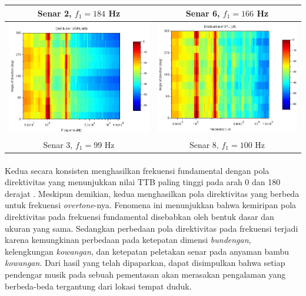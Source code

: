 \begin{table}[t!]
\begin{tabular}{c c}
        Senar 2, $f_1=184$ Hz & Senar 6, $f_1=166$ Hz \\
        \hline
        \includegraphics[width=65mm]{Gambar/senar3yangA.jpg} & \includegraphics[width=65mm]{Gambar/senar8yangB.jpg}\\
        Senar 3, $f_1=99$ Hz & Senar 8, $f_1=100$ Hz \\
        \hline
    \end{tabular}
    \label{tab:prosidingDirektivitas}
\end{table}
\newpage
\paragraph{}
\newpage
Kedua \bundengan secara konsisten menghasilkan frekuensi fundamental dengan pola direktivitas yang menunjukkan nilai TTB paling tinggi pada arah 0 dan 180 derajat \cite{prosidingDirektivitas}. Meskipun demikian, kedua \bundengan menghasilkan pola direktivitas yang berbeda untuk frekuensi \textit{overtone}-nya. Fenomena ini menunjukkan bahwa kemiripan pola direktivitas pada frekuensi fundamental disebabkan oleh bentuk dasar dan ukuran yang sama. Sedangkan perbedaan pola direktivitas pada frekuensi \overtone terjadi karena kemungkinan perbedaan pada ketepatan dimensi \textit{bundengan}, kelengkungan \textit{kowangan}, dan ketepatan peletakan senar pada anyaman bambu \textit{kowangan}. Dari hasil yang telah dipaparkan, dapat disimpulkan bahwa setiap pendengar musik \bundengan pada sebuah pementasan akan merasakan pengalaman yang berbeda-beda tergantung dari lokasi tempat duduk. \par 

